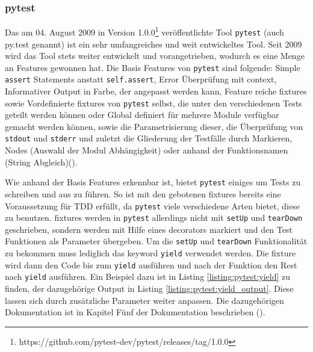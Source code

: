 \subsubsection{pytest}\label{python-tools:pytest}\mbox{}
\newline
Das am 04. August 2009 in Version
1.0.0\footnote{https://github.com/pytest-dev/pytest/releases/tag/1.0.0}
veröffentlichte Tool \lstinline{pytest} (auch py.test genannt)
ist ein sehr umfangreiches und weit entwickeltes Tool. Seit 2009 wird das Tool
stets weiter entwickelt und vorangetrieben, wodurch es eine Menge an Features
gewonnen hat.
\noindent
Die Basis Features von \lstinline{pytest} sind folgende:
Simple \lstinline{assert} Statements anstatt \lstinline{self.assert}, Error
Überprüfung mit \Gls{context}, Informativer Output in Farbe, der angepasst
werden kann, Feature reiche \Glspl{fixture} sowie Vordefinierte \Glspl{fixture}
von \lstinline{pytest} selbst, die unter den verschiedenen Tests geteilt werden
können oder Global definiert für mehrere Module verfügbar gemacht werden
können, sowie die Parametrisierung dieser, die Überprüfung von
\lstinline{stdout} und \lstinline{stderr} und zuletzt die Gliederung der
Testfälle durch Markieren, Nodes (Auswahl der Modul Abhängigkeit) oder anhand
der Funktionsnamen (String Abgleich)(\cite{docs.pytest.org:4.4}).
\newline

Wie anhand der Basis Features erkennbar ist, bietet \lstinline{pytest} einiges
um Tests zu schreiben und aus zu führen. So ist mit den gebotenen
\Glspl{fixture} bereits eine Voraussetzung für TDD erfüllt, da
\lstinline{pytest} viele verschiedene Arten bietet, diese zu benutzen.
\Glspl{fixture} werden in \lstinline{pytest} allerdings nicht mit
\lstinline{setUp} und \lstinline{tearDown} geschrieben, sondern werden mit Hilfe
eines \glspl{decorator} markiert und den Test Funktionen als Parameter
übergeben. Um die \lstinline{setUp} und \lstinline{tearDown} Funktionalität zu
bekommen muss lediglich das keyword \lstinline{yield} verwendet werden. Die
\Gls{fixture} wird dann den Code bis zum \lstinline{yield} ausführen und nach
der Funktion den Rest nach \lstinline{yield} ausführen. Ein Beispiel dazu ist in
Listing \ref{listing:pytest:yield} zu finden, der dazugehörige Output in
Listing \ref{listing:pytest:yield_output}. Diese lassen sich durch zusätzliche
Parameter weiter anpassen. Die dazugehörigen Dokumentation ist in Kapitel Fünf
der Dokumentation beschrieben (\cite{docs.pytest.org:4.4}).
\newline

